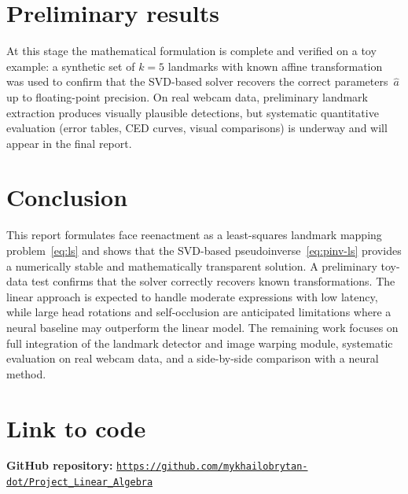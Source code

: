 \documentclass[11pt,a4paper]{article}
\begin{document}
\section{Preliminary results}
\label{sec:results}

At this stage the mathematical formulation is complete and verified on a toy example:
a synthetic set of $k=5$ landmarks with known affine transformation was used to
confirm that the SVD-based solver recovers the correct parameters~$\hat{a}$ up to
floating-point precision. On real webcam data, preliminary landmark extraction
produces visually plausible detections, but systematic quantitative evaluation
(error tables, CED curves, visual comparisons) is underway and will appear in the
final report.


\section{Conclusion}
\label{sec:conclusion}

This report formulates face reenactment as a least-squares landmark mapping
problem~\eqref{eq:ls} and shows that the SVD-based pseudoinverse~\eqref{eq:pinv-ls}
provides a numerically stable and mathematically transparent solution. A preliminary
toy-data test confirms that the solver correctly recovers known transformations.
The linear approach is expected to handle moderate expressions with low latency,
while large head rotations and self-occlusion are anticipated limitations where a
neural baseline may outperform the linear model. The remaining work focuses on
full integration of the landmark detector and image warping module, systematic
evaluation on real webcam data, and a side-by-side comparison with a neural method.

\section*{Link to code}

\noindent\textbf{GitHub repository:}
\texttt{\url{https://github.com/mykhailobrytan-dot/Project_Linear_Algebra}}
\end{document}
